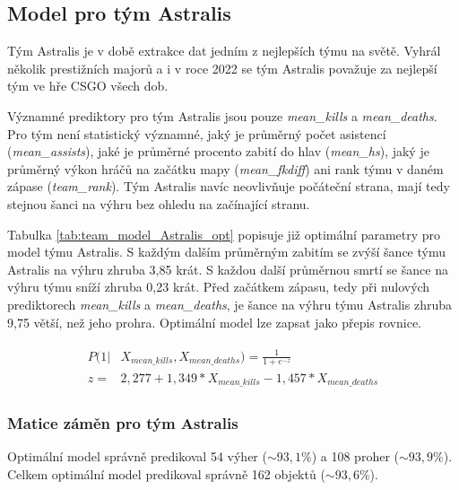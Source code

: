 \subsection{Model pro tým Astralis}
Tým Astralis je v době extrakce dat jedním z nejlepších týmu na světě. Vyhrál několik prestižních majorů a i v roce 2022 se tým Astralis považuje za nejlepší tým
ve hře \ac{CSGO} všech dob.



Významné prediktory pro tým Astralis jsou pouze \textit{mean\_kills} a \textit{mean\_deaths}.  Pro tým není statistický významné, jaký je průměrný počet asistencí
(\textit{mean\_assists}), jaké je průměrné procento zabití do hlav (\textit{mean\_hs}), jaký je průměrný výkon hráčů na začátku mapy (\textit{mean\_fkdiff}) ani 
rank týmu v daném zápase (\textit{team\_rank}). Tým Astralis navíc neovlivňuje počáteční strana, mají tedy stejnou šanci na výhru bez ohledu na 
začínající stranu.



Tabulka \ref{tab:team_model_Astralis_opt} popisuje již optimální parametry pro model týmu Astralis. S každým dalším průměrným zabitím se zvýší šance
týmu Astralis na výhru zhruba 3,85 krát. S každou další průměrnou smrtí se šance na výhru týmu sníží zhruba 0,23 krát. 
Před začátkem zápasu, tedy při nulových prediktorech \textit{mean\_kills} a \textit{mean\_deaths}, je šance na výhru týmu Astralis zhruba 9,75 větší, než jeho
prohra. Optimální model lze zapsat jako přepis rovnice.

\begin{align}
    \begin{split}
        P(1 | &X_{mean\_kills},  X_{mean\_deaths}) = \frac{1}{1 + e^{-z}} \\
        z = &2,277 + 1,349*X_{mean\_kills} - 1,457*X_{mean\_deaths}
    \end{split}
\end{align}

\subsubsection{Matice záměn pro tým Astralis}



Optimální model správně predikoval 54 výher ($\sim 93,1\%$) a 108 proher ($\sim 93,9\%$). Celkem optimální model predikoval správně 162 objektů ($\sim 93,6\%$).

